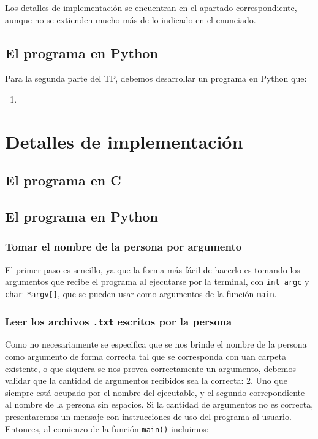 \documentclass[a4paper]{article}
\begin{document}
Los detalles de implementación se encuentran en el apartado correspondiente, aunque no se extienden mucho más de lo indicado en el enunciado.

\subsection{El programa en Python}

\noindent Para la segunda parte del TP, debemos desarrollar un programa en Python que:

\begin{enumerate}
    \item %
\end{enumerate}

\section{Detalles de implementación}

\subsection{El programa en C}

\subsection{El programa en Python}

\subsubsection{Tomar el nombre de la persona por argumento}

El primer paso es sencillo, ya que la forma más fácil de hacerlo es tomando los argumentos que recibe el programa al ejecutarse por la terminal, con \texttt{int argc} y \texttt{char *argv[]}, que se pueden usar como argumentos de la función \texttt{main}.

\subsubsection{Leer los archivos \texttt{.txt} escritos por la persona}

Como no necesariamente se especifica que se nos brinde el nombre de la persona como argumento de forma correcta tal que se corresponda con uan carpeta existente, o que siquiera se nos provea correctamente un argumento, debemos validar que la cantidad de argumentos recibidos sea la correcta: 2. Uno que siempre está ocupado por el nombre del ejecutable, y el segundo correpondiente al nombre de la persona sin espacios. Si la cantidad de argumentos no es correcta, presentaremos un mensaje con instrucciones de uso del programa al usuario. Entonces, al comienzo de la función \texttt{main()} incluimos:
\end{document}

